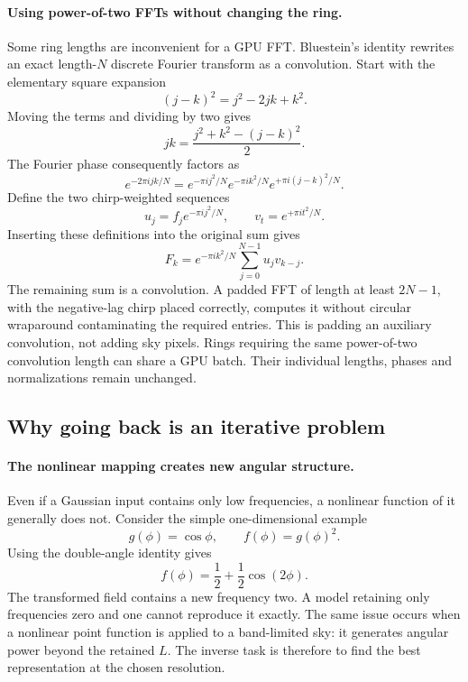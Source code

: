 \paragraph{Using power-of-two FFTs without changing the ring.}
Some ring lengths are inconvenient for a GPU FFT. Bluestein's identity
rewrites an exact length-$N$ discrete Fourier transform as a convolution.
Start with the elementary square expansion
\begin{equation}
 (j-k)^2=j^2-2jk+k^2.
\end{equation}
Moving the terms and dividing by two gives
\begin{equation}
 jk=\frac{j^2+k^2-(j-k)^2}{2}.
\end{equation}
The Fourier phase consequently factors as
\begin{equation}
 e^{-2\pi ijk/N}
 =e^{-\pi ij^2/N}e^{-\pi ik^2/N}e^{+\pi i(j-k)^2/N}.
\end{equation}
Define the two chirp-weighted sequences
\begin{equation}
 u_j=f_j e^{-\pi ij^2/N},\qquad v_t=e^{+\pi it^2/N}.
\end{equation}
Inserting these definitions into the original sum gives
\begin{equation}
 F_k=e^{-\pi ik^2/N}\sum_{j=0}^{N-1}u_j v_{k-j}.
\end{equation}
The remaining sum is a convolution. A padded FFT of length at least
$2N-1$, with the negative-lag chirp placed correctly, computes it without
circular wraparound contaminating the required entries. This is padding
an auxiliary convolution, not adding sky pixels. Rings requiring the same
power-of-two convolution length can share a GPU batch. Their individual
lengths, phases and normalizations remain unchanged.

\subsection{Why going back is an iterative problem}

\paragraph{The nonlinear mapping creates new angular structure.}
Even if a Gaussian input contains only low frequencies, a nonlinear
function of it generally does not. Consider the simple one-dimensional
example
\begin{equation}
 g(\phi)=\cos\phi,\qquad f(\phi)=g(\phi)^2.
\end{equation}
Using the double-angle identity gives
\begin{equation}
 f(\phi)=\frac12+\frac12\cos(2\phi).
\end{equation}
The transformed field contains a new frequency two. A model retaining
only frequencies zero and one cannot reproduce it exactly. The same issue
occurs when a nonlinear point function is applied to a band-limited sky:
it generates angular power beyond the retained $L$. The inverse task is
therefore to find the best representation at the chosen resolution.

